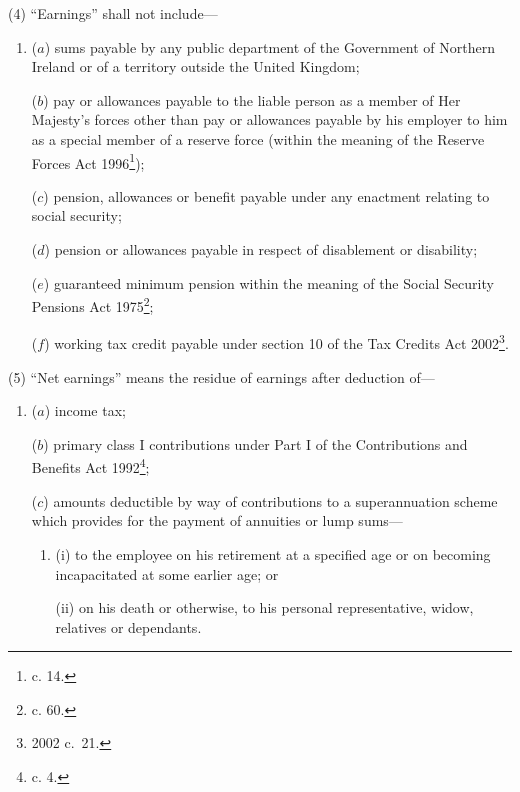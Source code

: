\documentclass[12pt,a4paper]{article}
\begin{document}
(4) “Earnings” shall not include—
\begin{enumerate}\item[]
($a$) sums payable by any public department of the Government of Northern Ireland or of a territory outside the United Kingdom;

($b$) pay or allowances payable to the liable person as a member of Her Majesty’s forces
other than pay or allowances payable by his employer to him as a special member of a reserve force (within the meaning of the Reserve Forces Act 1996\footnote{ c. 14.});  %

($c$) pension, allowances or benefit payable under any enactment relating to social security;

($d$) pension or allowances payable in respect of disablement or disability;

($e$) guaranteed minimum pension within the meaning of the Social Security Pensions Act 1975\footnote{ c. 60.};

($f$) working tax credit payable under section 10 of the Tax Credits Act 2002\footnote{2002 c.\ 21.}.
\end{enumerate}

(5) “Net earnings” means the residue of earnings after deduction of—
\begin{enumerate}\item[]
($a$) income tax;

($b$) primary class I contributions under Part I of the Contributions and Benefits Act 1992\footnote{ c. 4.};

($c$) amounts deductible by way of contributions to a superannuation scheme which provides for the payment of annuities or 
lump %
sums—
\begin{enumerate}\item[]
(i) to the employee on his retirement at a specified age or on becoming incapacitated at some earlier age; or

(ii) on his death or otherwise, to his personal representative, widow, relatives or dependants.
\end{enumerate}
\end{enumerate}
\end{document}
